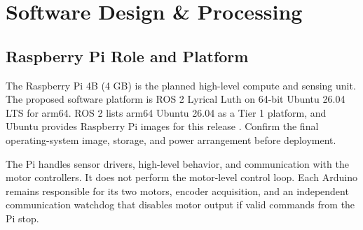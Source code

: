 \section{Software Design \& Processing}

\subsection{Raspberry Pi Role and Platform}
The Raspberry Pi 4B (4 GB) is the planned high-level compute and sensing unit. The proposed software platform is ROS 2 Lyrical Luth on 64-bit Ubuntu 26.04 LTS for arm64. ROS 2 lists arm64 Ubuntu 26.04 as a Tier 1 platform, and Ubuntu provides Raspberry Pi images for this release \cite{ros_lyrical_platforms,ubuntu_raspberry_pi}. Confirm the final operating-system image, storage, and power arrangement before deployment.

The Pi handles sensor drivers, high-level behavior, and communication with the motor controllers. It does not perform the motor-level control loop. Each Arduino remains responsible for its two motors, encoder acquisition, and an independent communication watchdog that disables motor output if valid commands from the Pi stop.

